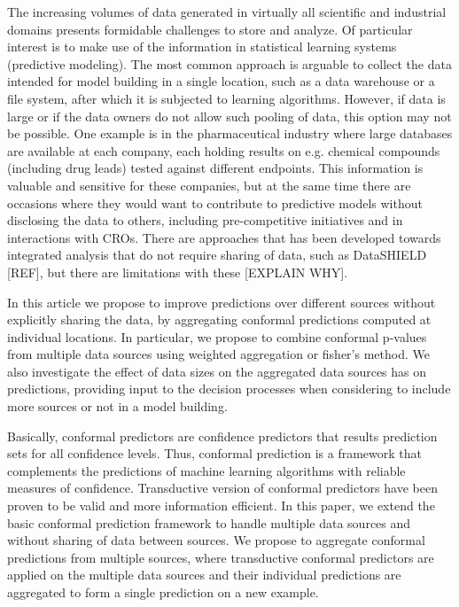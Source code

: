 \documentclass[main]{subfiles}
\begin{document}
The increasing volumes of data generated in virtually all scientific and industrial domains presents formidable challenges to store and analyze. Of particular interest is to make use of the information in statistical learning systems (predictive modeling). The most common approach is arguable to collect the data intended for model building in a single location, such as a data warehouse or a file system, after which it is subjected to learning algorithms. However, if data is large or if the data owners do not allow such pooling of data, this option may not be possible. One example is in the pharmaceutical industry where large databases are available at each company, each holding results on e.g. chemical compounds (including drug leads) tested against different endpoints. This information is valuable and sensitive for these companies, but at the same time there are occasions where they would want to contribute to predictive models without disclosing the data to others, including pre-competitive initiatives and in interactions with CROs. There are approaches that has been developed towards integrated analysis that do not require sharing of data, such as DataSHIELD [REF], but there are limitations with these [EXPLAIN WHY].
 
In this article we propose to improve predictions over different sources without explicitly sharing the data, by aggregating conformal predictions computed at individual locations. 
In particular, we propose to combine conformal p-values from multiple data sources using weighted aggregation or fisher's method.
We also investigate the effect of data sizes on the aggregated data sources has on predictions, providing input to the decision processes when considering to include more sources or not in a model building.


Basically, conformal predictors are confidence predictors that results prediction sets for all confidence levels. Thus, conformal prediction is a framework that complements the predictions of machine learning algorithms with reliable measures of confidence.
Transductive version of conformal predictors have been proven to be valid and more information efficient. In this paper, we extend the basic conformal prediction framework to handle multiple data sources and without sharing of data between sources. We propose to aggregate conformal predictions from multiple sources, where transductive conformal predictors are applied on the multiple data sources and their individual predictions are aggregated to form a single prediction on a new example.
\end{document}
